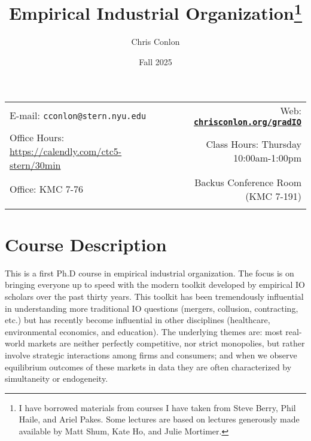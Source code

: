 \documentclass[11pt]{article}
\title{Empirical Industrial Organization\footnote{I have borrowed materials from courses I have taken from Steve Berry, Phil Haile, and Ariel Pakes. Some lectures are based on lectures generously made available by Matt Shum, Kate Ho, and Julie Mortimer.}}
\author{Chris Conlon}
\date{Fall 2025}
\newcommand{\blankline}{\quad\pagebreak[2]}
\begin{document}
\maketitle
\blankline
\begin{tabular*}{.93\textwidth}{@{\extracolsep{\fill}}lr}
  E-mail: \texttt{cconlon@stern.nyu.edu} & Web: \href{http://chrisconlon.org}{\tt\bf chrisconlon.org/gradIO}  \\
  Office Hours: \url{https://calendly.com/ctc5-stern/30min} &  Class Hours: Thursday 10:00am-1:00pm \\
  Office: KMC 7-76  & Backus Conference Room (KMC 7-191) \\
&  \\
\hline
\end{tabular*}
\vspace{10 mm}
\section*{Course Description}
This is a first Ph.D course in empirical industrial organization. The focus is on bringing everyone up to speed with the modern toolkit developed by empirical IO scholars over the past thirty years. This toolkit has been tremendously influential in understanding more traditional IO questions (mergers, collusion, contracting, etc.) but has recently become influential in other disciplines (healthcare, environmental economics, and education). The underlying themes are: most real-world markets are neither perfectly competitive, nor strict monopolies, but rather involve strategic interactions among firms and consumers; and when we observe equilibrium outcomes of these markets in data they are often characterized by simultaneity or endogeneity.
\end{document}
